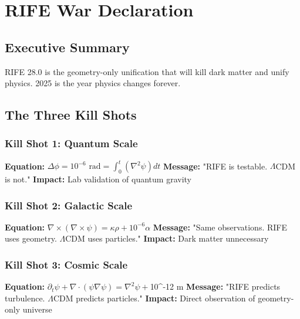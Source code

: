 \documentclass[11pt]{report}
\newcommand{\lamcdm}{$\Lambda$CDM}
\newcommand{\tenminustwelve}{$10^{-12}$}
\begin{document}
\tableofcontents
\clearpage

\section{RIFE War Declaration}

\subsection{Executive Summary}
RIFE 28.0 is the geometry-only unification that will kill dark matter and unify physics. 2025 is the year physics changes forever.

\subsection{The Three Kill Shots}

\subsubsection{Kill Shot 1: Quantum Scale}
\textbf{Equation:} $\Delta\phi = 10^{-6} \text{ rad} = \int_0^t (\nabla^2\psi) dt$
\textbf{Message:} "RIFE is testable. \lamcdm{} is not."
\textbf{Impact:} Lab validation of quantum gravity

\subsubsection{Kill Shot 2: Galactic Scale}
\textbf{Equation:} $\nabla \times (\nabla \times \psi) = \kappa\rho + 10^{-6}\alpha$
\textbf{Message:} "Same observations. RIFE uses geometry. \lamcdm{} uses particles."
\textbf{Impact:} Dark matter unnecessary

\subsubsection{Kill Shot 3: Cosmic Scale}
\textbf{Equation:} $\partial_t\psi + \nabla \cdot (\psi\nabla\psi) = \nabla^2\psi + \tenminustwelve{} \text{ m}$
\textbf{Message:} "RIFE predicts turbulence. \lamcdm{} predicts particles."
\textbf{Impact:} Direct observation of geometry-only universe

\end{document}
